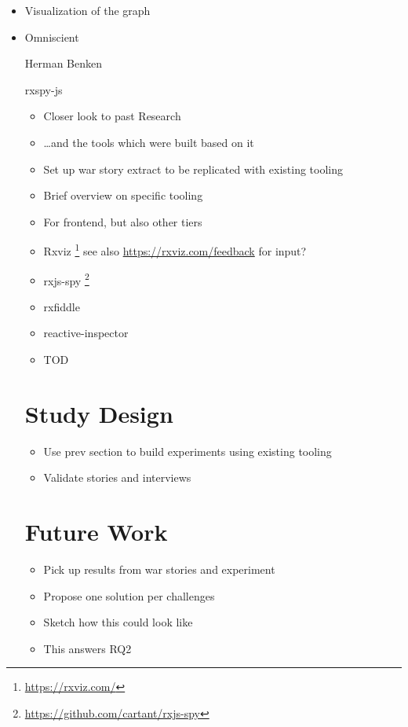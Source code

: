 \documentclass[12pt,a4paper]{article}
\begin{document}
\begin{itemize}
	\item Visualization of the graph
	\item Omniscient

Herman Benken \cite{rxfiddle}

rxspy-js

\begin{itemize}
	\item Closer look to past Research
	\item \dots and the tools which were built based on it
	\item Set up war story extract to be replicated with existing tooling
\end{itemize}

\begin{itemize}
	\item Brief overview on specific tooling
	\item For frontend, but also other tiers
	\item Rxviz \footnote{\url{https://rxviz.com/}} see also \url{https://rxviz.com/feedback} for input?
	\item rxjs-spy \footnote{\url{https://github.com/cartant/rxjs-spy}}
	\item rxfiddle \cite{10.1145/3180155.3180156}
	\item reactive-inspector \cite{10.1145/2884781.2884815}
	\item TOD \cite{5287015}
\end{itemize}


\section{Study Design}
\label{sec:study}

\begin{itemize}
	\item Use prev section to build experiments using existing tooling
	\item Validate stories and interviews
\end{itemize}

\section{Future Work}
\label{sec:future}

\begin{itemize}
	\item Pick up results from war stories and experiment
	\item Propose one solution per challenges
	\item Sketch how this could look like
	\item This answers RQ2
\end{itemize}


\end{itemize}
\end{document}
